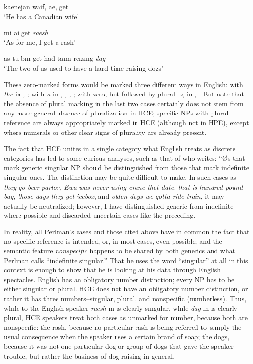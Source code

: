 \ea\label{ex:41}
kaenejan waif, ae, get \\
\glt `He has a Canadian wife'
\glt 
\z

\ea\label{ex:42}
mi ai get \textit{raesh}\\
\glt `As for me, I get a rash'
\z

\ea\label{ex:43}
as tu bin get had taim reizing \textit{dag}\\
\glt `The two of us used to have a hard time raising dogs'
\z

These zero-marked forms would be marked three different ways in English: with \textit{the} in , ; with \textit{a} in , , , ; with zero, but followed by plural \textit{-s}, in , . But note that the absence of plural marking in the last two cases certainly does not stem from any more general absence of pluralization in HCE; specific NPs with plural reference are always appropriately marked in HCE (although not in HPE), except where numerals or other clear signs of plurality are already present.

The fact that HCE unites in a single category what English treats as discrete categories has led to some curious analyses, such as that of \citet[99]{Perlman1973} who writes: ``{\O}s that mark generic singular NP should be distinguished from those that mark indefinite singular ones. The distinction may be quite difficult to make. In such cases as \textit{they go beer parlor, Ewa was never using crane that date, that is hundred-pound bag, those days they get icebox}, and \textit{olden days we gotta ride train}, it may actually be neutralized; however, I have dis\-tinguished generic from indefinite where possible and discarded un\-certain cases like the preceding.{\textquotedbl}

In reality, all Perlman's cases and those cited above have in common the fact that no specific reference is intended, or, in most cases, even possible; and the semantic feature \textit{nonspecific} happens to be
shared by both generics and what Perlman calls ``indefinite singular.'' That he uses the word ``singular'' at all in this context is enough to show that he is looking at his data through English spectacles. English has an obligatory number distinction; every NP has to be either singular or plural. HCE does not have an obligatory number distinction, or rather it has three numbers--singular, plural, and nonspecific (number\-less). Thus, while to the English speaker \textit{raesh} in  is clearly singular, while \textit{dag} in  is clearly plural, HCE speakers treat both cases as unmarked for number, because both are nonspecific: the rash, because no particular rash is being referred to--simply the usual consequence when the speaker uses a certain brand of soap; the dogs, because it was not one particular dog or group of dogs that gave the speaker trouble, but rather the business of dog-raising in general.

